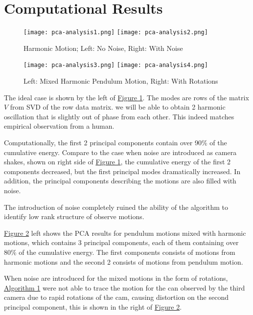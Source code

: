 \documentclass{article}
\begin{document}
\section{Computational Results}
    \begin{figure}[h]
        \hspace{-4em}
        \texttt{[image: pca-analysis1.png]}
        \hspace{-3em}
        \texttt{[image: pca-analysis2.png]}
        \caption{Harmonic Motion; Left: No Noise, Right: With Noise }
        \label{fig:fig1}
    \end{figure}
    \begin{figure}[h]
        \hspace{-4em}
        \texttt{[image: pca-analysis3.png]}
        \hspace{-3em}
        \texttt{[image: pca-analysis4.png]}
        \caption{Left: Mixed Harmonic Pendulum Motion, Right: With Rotations }
        \label{fig:fig2}
    \end{figure}
    The ideal case is shown by the left of \hyperref[fig:fig1]{Figure 1}. The modes are rows of the matrix $V$ from SVD of the row data matrix. we will be able to obtain 2 harmonic oscillation that is slightly out of phase from each other. This indeed matches empirical observation from a human.
    \par
    Computationally, the first 2 principal components contain over 90\% of the cumulative energy. Compare to the case when noise are introduced as camera shakes, shown on right side of \hyperref[fig:fig1]{Figure 1}, the cumulative energy of the first 2 components decreased, but the first principal modes dramatically increased. In addition, the principal components describing the motions are also filled with noise. 
    \par
    The introduction of noise completely ruined the ability of the algorithm to identify low rank structure of observe motions.  
    \par
    \hyperref[fig:fig2]{Figure 2} left shows the PCA results for pendulum motions mixed with harmonic motions, which contains 3 principal components, each of them containing over 80\% of the cumulative energy. The first components consists of motions from harmonic motions and the second 2 consists of motions from pendulum motion. 
    \par
    When noise are introduced for the mixed motions in the form of rotations, \hyperref[alg:algorithm1]{Algorithm 1} were not able to trace the motion for the can observed by the third camera due to rapid rotations of the cam, causing distortion on the second principal component, this is shown in the right of \hyperref[fig:fig2]{Figure 2}. 
\end{document}
